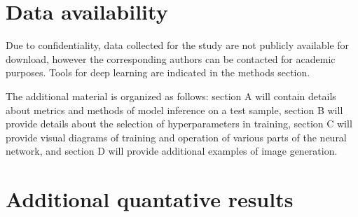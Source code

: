 \documentclass{article}
\begin{document}
\section{Data availability}
Due to confidentiality, data collected for the study are not publicly available for download, however the corresponding authors can be contacted for academic purposes. Tools for deep learning are indicated in the methods
section.




\newpage
\appendix
The additional material is organized as follows: section A will contain details about metrics and methods of model inference on a test sample, section B will provide details about the selection of hyperparameters in training, section C will provide visual diagrams of training and operation of various parts of the neural network, and section D will provide additional examples of image generation.

\section{Additional quantative results}
\end{document}
